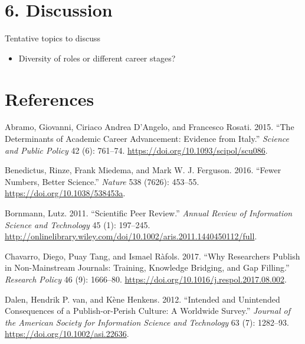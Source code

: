 \documentclass[]{elsarticle} %
\providecommand{\tightlist}{%
  \setlength{\itemsep}{0pt}\setlength{\parskip}{0pt}}
\begin{document}
\hypertarget{discussion}{%
\section{6. Discussion}\label{discussion}}

Tentative topics to discuss

\begin{itemize}
\tightlist
\item
  Diversity of roles or different career stages?
\end{itemize}

\hypertarget{references}{%
\section*{References}\label{references}}

\hypertarget{refs}{}
\leavevmode\hypertarget{ref-abramoDeterminantsAcademicCareer2015}{}%
Abramo, Giovanni, Ciriaco Andrea D'Angelo, and Francesco Rosati. 2015.
``The Determinants of Academic Career Advancement: Evidence from
Italy.'' \emph{Science and Public Policy} 42 (6): 761--74.
\url{https://doi.org/10.1093/scipol/scu086}.

\leavevmode\hypertarget{ref-benedictusFewerNumbersBetter2016}{}%
Benedictus, Rinze, Frank Miedema, and Mark W. J. Ferguson. 2016. ``Fewer
Numbers, Better Science.'' \emph{Nature} 538 (7626): 453--55.
\url{https://doi.org/10.1038/538453a}.

\leavevmode\hypertarget{ref-bornmannScientificPeerReview2011}{}%
Bornmann, Lutz. 2011. ``Scientific Peer Review.'' \emph{Annual Review of
Information Science and Technology} 45 (1): 197--245.
\url{http://onlinelibrary.wiley.com/doi/10.1002/aris.2011.1440450112/full}.

\leavevmode\hypertarget{ref-chavarroWhyResearchersPublish2017}{}%
Chavarro, Diego, Puay Tang, and Ismael Ràfols. 2017. ``Why Researchers
Publish in Non-Mainstream Journals: Training, Knowledge Bridging, and
Gap Filling.'' \emph{Research Policy} 46 (9): 1666--80.
\url{https://doi.org/10.1016/j.respol.2017.08.002}.

\leavevmode\hypertarget{ref-dalenIntendedUnintendedConsequences2012}{}%
Dalen, Hendrik P. van, and Kène Henkens. 2012. ``Intended and Unintended
Consequences of a Publish-or-Perish Culture: A Worldwide Survey.''
\emph{Journal of the American Society for Information Science and
Technology} 63 (7): 1282--93. \url{https://doi.org/10.1002/asi.22636}.
\end{document}
